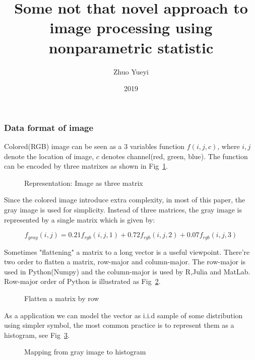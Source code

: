 \documentclass{beamer}
\title{Some not that novel approach to image processing using nonparametric statistic }
\author{Zhuo Yueyi}
\institute[NUST]{Department of Computer Science and Engineering}
\date{2019}
\begin{document}
\frame{\titlepage}

\begin{frame}

    \frametitle{Data format of image}

    Colored(RGB) image can be seen as a 3 variables function  $f(i,j,c)$, where $i,j$ denote the location of image, $c$ denotes
    channel(red, green, blue). The function can be encoded by three matrixes as shown in Fig~\ref{fig:toad_rgb}.

    \begin{figure}[htb]
    \centering
    \scalebox{.75}{}
    \caption{Representation: Image as three matrix}
    \label{fig:toad_rgb}
    \end{figure}


\end{frame}

\begin{frame}

    Since the colored image introduce extra complexity, in most of this paper, the gray image is used for simplicity.
    Instead of three matrices, the gray image is represented by a single matrix which is given by:
    
    \begin{equation}
      f_{gray}(i,j) = 0.21 f_{rgb}(i,j,1) + 0.72 f_{rgb}(i,j,2) + 0.07 f_{rgb}(i,j,3)
      \label{eq:rgb_to_gray}
    \end{equation}
    
    Sometimes "flattening" a matrix to a long vector is a useful viewpoint. There're two order to flatten a matrix,
    row-major and column-major. The row-major is used in Python(Numpy) and the column-major is used by R,Julia and MatLab.
    Row-major order of Python is illustrated as Fig~\ref{fig:flatten_matrix}.
    
    \begin{figure}[htb]
      \centering
      
      \caption{Flatten a matrix by row}
      \label{fig:flatten_matrix}
    \end{figure}
    
\end{frame}

\begin{frame}
    As a application we can model the vector as i.i.d sample of some distribution using simpler symbol, the most 
    common practice is to represent them as a histogram, see Fig~\ref{fig:map_gray_to_hist}. 

    \begin{figure}[htb]
    \centering
    
    \caption{Mapping from gray image to histogram}
    \label{fig:map_gray_to_hist}
    \end{figure}

\end{frame}
\end{document}
